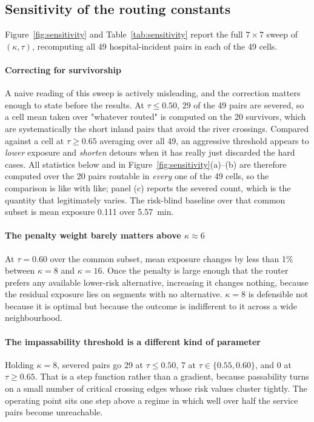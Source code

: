 \documentclass[journal]{IEEEtran}
\begin{document}
\subsection{Sensitivity of the routing constants}
\label{sec:res-sensitivity}

Figure~\ref{fig:sensitivity} and Table~\ref{tab:sensitivity} report the full
$7\times7$ sweep of $(\kappa,\tau)$, recomputing all 49 hospital-incident pairs
in each of the 49 cells.

\paragraph{Correcting for survivorship} A naive reading of this sweep is
actively misleading, and the correction matters enough to state before the
results. At $\tau\le0.50$, 29 of the 49 pairs are severed, so a cell mean taken
over "whatever routed" is computed on the 20 survivors, which are systematically
the short inland pairs that avoid the river crossings. Compared against a cell at
$\tau\ge0.65$ averaging over all 49, an aggressive threshold appears to
\emph{lower} exposure and \emph{shorten} detours when it has really just discarded
the hard cases. All statistics below and in
Figure~\ref{fig:sensitivity}(a)--(b) are therefore computed over the 20 pairs
routable in \emph{every} one of the 49 cells, so the comparison is like with
like; panel (c) reports the severed count, which is the quantity that legitimately
varies. The risk-blind baseline over that common subset is mean exposure 0.111
over \SI{5.57}{\minute}.

\paragraph{The penalty weight barely matters above $\kappa\approx6$}
At $\tau=0.60$ over the common subset, mean exposure changes by less than 1\%
between $\kappa=8$ and $\kappa=16$. Once the penalty is large enough that the
router prefers any available lower-risk alternative, increasing it changes
nothing, because the residual exposure lies on segments with no alternative.
$\kappa=8$ is defensible not because it is optimal but because the outcome is
indifferent to it across a wide neighbourhood.

\paragraph{The impassability threshold is a different kind of parameter}
Holding $\kappa=8$, severed pairs go 29 at $\tau\le0.50$, 7 at
$\tau\in\{0.55,0.60\}$, and 0 at $\tau\ge0.65$. That is a step function rather
than a gradient, because passability turns on a small number of critical crossing
edges whose risk values cluster tightly. The operating point sits one step above
a regime in which well over half the service pairs become unreachable.
\end{document}
